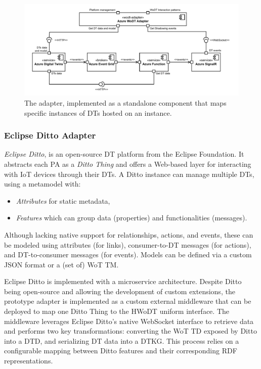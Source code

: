 \begin{figure}
    \centering
    \includegraphics[width=\textwidth]{figures/hwodt/adtadapter-c&c.pdf}
    \caption{The \azureTwin{} adapter, implemented as a standalone component that maps specific instances of \acp{DT} hosted on an \azureTwin{} instance.}
    \label{fig:azure-adapter-c&c}
\end{figure}

\subsubsection{Eclipse Ditto Adapter}

\emph{Eclipse Ditto}, is an open-source \ac{DT} platform from the Eclipse Foundation. 
It abstracts each \ac{PA} as a \emph{Ditto Thing} and offers a Web-based layer for interacting with \ac{IoT} devices through their \acp{DT}.
%
A Ditto instance can manage multiple \acp{DT}, using a metamodel with:
\begin{itemize}
    \item \emph{Attributes} for static metadata,
    \item \emph{Features} which can group data (properties) and functionalities (messages).
\end{itemize}
Although lacking native support for relationships, actions, and events, these can be modeled using attributes (for links), consumer-to-\ac{DT} messages (for actions), and \ac{DT}-to-consumer messages (for events). Models can be defined via a custom JSON format or a (set of) \ac{WoT} \ac{TM}.

Eclipse Ditto is implemented with a microservice architecture. 
Despite Ditto being open-source and allowing the development of custom extensions, the prototype adapter is implemented as a custom external middleware that can be deployed to map one Ditto Thing to the \ac{HWoDT} uniform interface.
%
The middleware leverages Eclipse Ditto's native WebSocket interface to retrieve data and performs two key transformations: converting the \ac{WoT} \ac{TD} exposed by Ditto into a \ac{DTD}, and serializing \ac{DT} data into a \ac{DTKG}.
This process relies on a configurable mapping between Ditto features and their corresponding \ac{RDF} representations.

